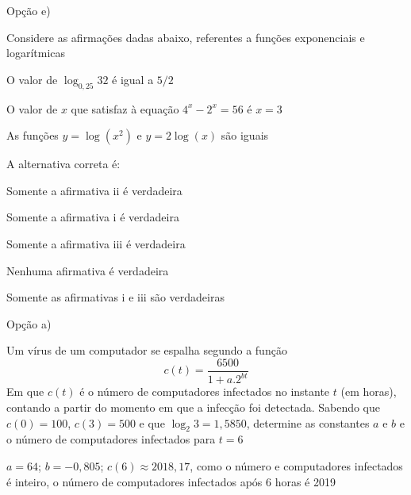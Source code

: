 \begin{exercises*}
\begin{exercise}
  \begin{answer}
    Opção e)
  \end{answer}
\end{exercise}

\begin{exercise}
  Considere as afirmações dadas abaixo, referentes a funções exponenciais e
  logarítmicas
  \begin{romanlist}
    \item O valor de $\log_{0,25} 32$ é igual a $5/2$
    \item O valor de $x$ que satisfaz à equação $4^x-2^x = 56$ é $x = 3$
    \item As funções $y=\log (x^2)$ e $y=2\log (x)$ são iguais
  \end{romanlist}
  A alternativa correta é:
  \begin{alphalist}
    \item Somente a afirmativa ii é verdadeira
    \item Somente a afirmativa i é verdadeira
    \item Somente a afirmativa iii é verdadeira
    \item Nenhuma afirmativa é verdadeira
    \item Somente as afirmativas i e iii são verdadeiras
  \end{alphalist}

  \begin{answer}
    Opção a)
  \end{answer}
\end{exercise}

\begin{exercise}
  Um vírus de um computador se espalha segundo a função
  \[
    c(t) = \frac{6500}{1+a.2^{bt}}
  \]
  Em que $c(t)$ é o número de computadores infectados no instante $t$ (em horas),
  contando a partir do momento em que a infecção foi detectada. Sabendo que
  $c(0)=100$, $c(3)=500$ e que $\log_2 3=1,5850$, determine as constantes $a$ e
  $b$ e o número de computadores infectados para $t=6$

  \begin{answer}
    $a = 64$; $b = -0,805$; $c(6) \approx 2018,17$, como o número e
    computadores infectados é inteiro, o número de computadores
    infectados após 6 horas é 2019
  \end{answer}
\end{exercise}


\end{exercises*}

